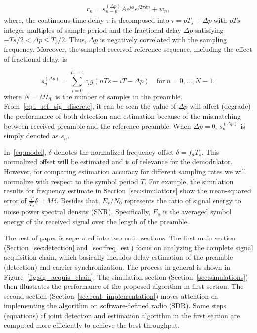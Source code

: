 \begin{equation}
    \begin{aligned}
      \label{eq:model}
      r_n = s_{n-p}^{(\Delta p)}Ae^{j\phi}e^{j2\pi\delta n}+w_{n},
    \end{aligned}
  \end{equation}
where, the continuous-time delay $\tau$ is decomposed into $\tau=pT_s+\Delta p$ with $pTs$ integer multiples of sample period and 
the fractional delay $\Delta p$ satisfying $-Ts/2 {<} \Delta p {\leq} T_s/2$. Thus, $\Delta p$ is negatively correlated with
the sampling frequency. Moreover, the sampled received reference sequence, including the effect of fractional delay, is

\begin{equation}
  \label{eq:l_ref_sig_discrete}
  s_n^{(\Delta p)} = \sum_{i=0}^{L_0-1} c_i g(nTs-iT-\Delta p) \quad \text{for}~n=0,\ldots,N-1,
\end{equation}
where $N=ML_0$ is the number of samples in the preamble. 
From~\eqref{eq:l_ref_sig_discrete}, it can be seen the value of $\Delta p$ will affect (degrade) the performance of both detection and estimation 
because of the mismatching between received preamble and the reference preamble.
When $\Delta p=0$, $s_n^{(\Delta p)}$ is simply denoted as $s_n$.

In~\eqref{eq:model}, $\delta$ denotes the normalized frequency offset $\delta=f_dT_s$. This normalized offset
will be estimated and is of relevance for the demodulator. However, for comparing estimation accuracy for different
sampling rates we will normalize with respect to the symbol period $T$. For example, the simulation results for frequency estimate 
in Section~\ref{sec:simulations} show the mean-squared error of $\frac{T}{T_s}\delta=M\delta$.
Besides that, $E_s/N_0$ represents the ratio of signal energy to noise power spectral density (SNR).
Specifically, $E_s$ is the averaged symbol energy of the received signal over the length of the preamble.

The rest of paper is seperated into two main sections. The first main section (Section~\ref{sec:detection} and~\ref{sec:freq_est}) focus on analyzing the complete
signal acquisition chain, which basically includes delay estimation of the preamble (detection) and
carrier synchronization. The process in general is shown in Figure~\ref{fig:sig_acquis_chain}.
The simulation section (Section~\ref{sec:simulations}) then illustrates the performance of the proposed algorithm in first section.
The second section (Section~\ref{sec:real_implementation}) moves attention on implementing the algorithm 
on software-defined radio (SDR). Some steps (equations) of joint detection and estimation algorithm in the first section are computed more efficiently to achieve the best throughput.

